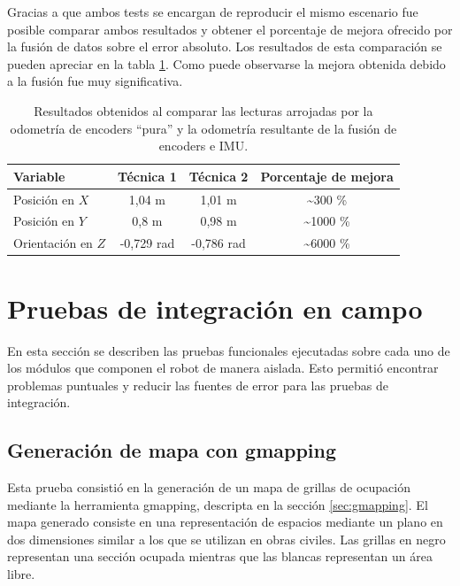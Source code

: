 Gracias a que ambos tests se encargan de reproducir el mismo escenario fue posible comparar ambos resultados y obtener el porcentaje de mejora ofrecido por la fusión de datos sobre el error absoluto. Los resultados de esta comparación se pueden apreciar en la tabla \ref{tab:comparacionOdom}. Como puede observarse la mejora obtenida debido a la fusión fue muy significativa.

\begin{table}[!htbp]
    \centering
    \centering
    \caption[Comparacion de calculos de odometría]{Resultados obtenidos al comparar las lecturas arrojadas por la odometría de encoders ``pura'' y la odometría resultante de la fusión de encoders e IMU.}
    \begin{tabular}{lccc}
        \toprule
        \textbf{Variable}  & \textbf{Técnica 1} & \textbf{Técnica 2} & \textbf{Porcentaje de mejora} \\
        \midrule
        Posición en $X$    & 1,04 m             & 1,01 m             & \textasciitilde300 \%         \\
        Posición en $Y$    & 0,8 m              & 0,98 m             & \textasciitilde1000 \%        \\
        Orientación en $Z$ & -0,729 rad         & -0,786 rad         & \textasciitilde6000 \%        \\
        \bottomrule
    \end{tabular}
    \label{tab:comparacionOdom}
\end{table}


\section{Pruebas de integración en campo}

En esta sección se describen las pruebas funcionales ejecutadas sobre cada uno de los módulos que componen el robot de manera aislada. Esto permitió encontrar problemas puntuales y reducir las fuentes de error para las pruebas de integración.

\subsection{Generación de mapa con gmapping}

Esta prueba consistió en la generación de un mapa de grillas de ocupación mediante la herramienta gmapping, descripta en la sección \ref{sec:gmapping}. El mapa generado consiste en una representación de espacios mediante un plano en dos dimensiones similar a los que se utilizan en obras civiles. Las grillas en negro representan una sección ocupada mientras que las blancas representan un área libre.

